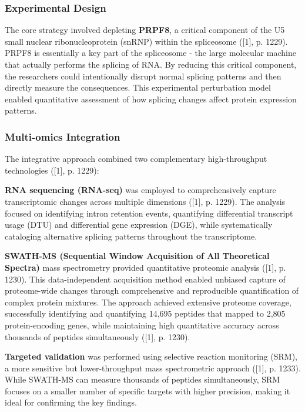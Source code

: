 \documentclass[12pt,a4paper]{article}
\begin{document}
\subsubsection{Experimental Design}

The core strategy involved depleting \textbf{PRPF8}, a critical component of the U5 small nuclear ribonucleoprotein (snRNP) within the spliceosome ([1], p. 1229). PRPF8 is essentially a key part of the spliceosome - the large molecular machine that actually performs the splicing of RNA. By reducing this critical component, the researchers could intentionally disrupt normal splicing patterns and then directly measure the consequences. This experimental perturbation model enabled quantitative assessment of how splicing changes affect protein expression patterns.

\subsubsection{Multi-omics Integration}

The integrative approach combined two complementary high-throughput technologies ([1], p. 1229):

\textbf{RNA sequencing (RNA-seq)} was employed to comprehensively capture transcriptomic changes across multiple dimensions ([1], p. 1229). The analysis focused on identifying intron retention events, quantifying differential transcript usage (DTU) and differential gene expression (DGE), while systematically cataloging alternative splicing patterns throughout the transcriptome.

\textbf{SWATH-MS (Sequential Window Acquisition of All Theoretical Spectra)} mass spectrometry provided quantitative proteomic analysis ([1], p. 1230). This data-independent acquisition method enabled unbiased capture of proteome-wide changes through comprehensive and reproducible quantification of complex protein mixtures. The approach achieved extensive proteome coverage, successfully identifying and quantifying 14,695 peptides that mapped to 2,805 protein-encoding genes, while maintaining high quantitative accuracy across thousands of peptides simultaneously ([1], p. 1230).

\textbf{Targeted validation} was performed using selective reaction monitoring (SRM), a more sensitive but lower-throughput mass spectrometric approach ([1], p. 1233). While SWATH-MS can measure thousands of peptides simultaneously, SRM focuses on a smaller number of specific targets with higher precision, making it ideal for confirming the key findings.
\end{document}

